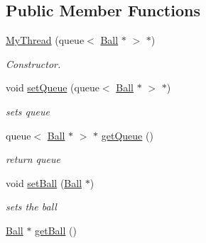 \subsection*{Public Member Functions}
\begin{DoxyCompactItemize}
\item 
\hypertarget{class_my_thread_a814ee8286a2406c3791ecaeb0eb042fb}{\hyperlink{class_my_thread_a814ee8286a2406c3791ecaeb0eb042fb}{My\-Thread} (queue$<$ \hyperlink{class_ball}{Ball} $\ast$ $>$ $\ast$)}\label{class_my_thread_a814ee8286a2406c3791ecaeb0eb042fb}

\begin{DoxyCompactList}\small\item\em Constructor. \end{DoxyCompactList}\item 
\hypertarget{class_my_thread_af6ab9a6669d1e1375f57bd35c8606ef1}{void \hyperlink{class_my_thread_af6ab9a6669d1e1375f57bd35c8606ef1}{set\-Queue} (queue$<$ \hyperlink{class_ball}{Ball} $\ast$ $>$ $\ast$)}\label{class_my_thread_af6ab9a6669d1e1375f57bd35c8606ef1}

\begin{DoxyCompactList}\small\item\em sets queue \end{DoxyCompactList}\item 
\hypertarget{class_my_thread_a9a3695f1605cea2664462cfe652b3f7b}{queue$<$ \hyperlink{class_ball}{Ball} $\ast$ $>$ $\ast$ \hyperlink{class_my_thread_a9a3695f1605cea2664462cfe652b3f7b}{get\-Queue} ()}\label{class_my_thread_a9a3695f1605cea2664462cfe652b3f7b}

\begin{DoxyCompactList}\small\item\em return queue \end{DoxyCompactList}\item 
\hypertarget{class_my_thread_a9289a1c82519f282f139f7d58a226a29}{void \hyperlink{class_my_thread_a9289a1c82519f282f139f7d58a226a29}{set\-Ball} (\hyperlink{class_ball}{Ball} $\ast$)}\label{class_my_thread_a9289a1c82519f282f139f7d58a226a29}

\begin{DoxyCompactList}\small\item\em sets the ball \end{DoxyCompactList}\item 
\hypertarget{class_my_thread_a06fb67170d01843c44cbea286c35546d}{\hyperlink{class_ball}{Ball} $\ast$ \hyperlink{class_my_thread_a06fb67170d01843c44cbea286c35546d}{get\-Ball} ()}\label{class_my_thread_a06fb67170d01843c44cbea286c35546d}


\end{DoxyCompactItemize}
